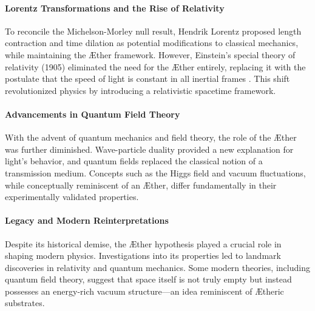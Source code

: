     \paragraph*{Lorentz Transformations and the Rise of Relativity}
    To reconcile the Michelson-Morley null result, Hendrik Lorentz proposed length contraction and time dilation as potential modifications to classical mechanics, while maintaining the Æther framework. However, Einstein’s special theory of relativity (1905) eliminated the need for the Æther entirely, replacing it with the postulate that the speed of light is constant in all inertial frames \cite{einstein1905}. This shift revolutionized physics by introducing a relativistic spacetime framework.

    \paragraph*{Advancements in Quantum Field Theory}
    With the advent of quantum mechanics and field theory, the role of the Æther was further diminished. Wave-particle duality provided a new explanation for light’s behavior, and quantum fields replaced the classical notion of a transmission medium. Concepts such as the Higgs field \cite{higgs1964} and vacuum fluctuations, while conceptually reminiscent of an Æther, differ fundamentally in their experimentally validated properties.

    \paragraph*{Legacy and Modern Reinterpretations}
    Despite its historical demise, the Æther hypothesis played a crucial role in shaping modern physics. Investigations into its properties led to landmark discoveries in relativity and quantum mechanics. Some modern theories, including quantum field theory, suggest that space itself is not truly empty but instead possesses an energy-rich vacuum structure—an idea reminiscent of Ætheric substrates.
